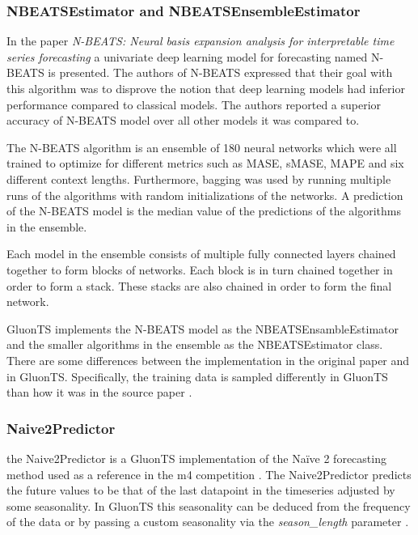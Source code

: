 \subsubsection{NBEATSEstimator and NBEATSEnsembleEstimator}
\label{algo:nbeats}
In the paper \textit{N-BEATS: Neural basis expansion analysis for interpretable time series forecasting} \cite{oreshkin_n_beats_2020} a univariate deep learning model for forecasting named N-BEATS is presented. The authors of N-BEATS expressed that their goal with this algorithm was to disprove the notion that deep learning models had inferior performance compared to classical models. The authors reported a superior accuracy of N-BEATS model over all other models it was compared to.

The N-BEATS algorithm is an ensemble of 180 neural networks which were all trained to optimize for different metrics such as MASE, sMASE, MAPE and six different context lengths. Furthermore, bagging was used by running multiple runs of the algorithms with random initializations of the networks. A prediction of the N-BEATS model is the median value of the predictions of the algorithms in the ensemble.

Each model in the ensemble consists of multiple fully connected layers chained together to form blocks of networks. Each block is in turn chained together in order to form a stack. These stacks are also chained in order to form the final network.

GluonTS implements the N-BEATS model as the NBEATSEnsambleEstimator and the smaller algorithms in the ensemble as the NBEATSEstimator class. There are some differences between the implementation in the original paper and in GluonTS. Specifically, the training data is sampled differently in GluonTS than how it was in the source paper \cite{gluonts-website}.

\subsubsection{Naive2Predictor}
\label{model:naive2}
the Naive2Predictor is a GluonTS implementation of the Naïve 2 forecasting method used as a reference in the m4 competition \cite{makridakis_m4_2020}. The Naive2Predictor predicts the future values to be that of the last datapoint in the timeseries adjusted by some seasonality. In GluonTS this seasonality can be deduced from the frequency of the data or by passing a custom seasonality via the \textit{season\_length} parameter \cite{gluonts-website}.

